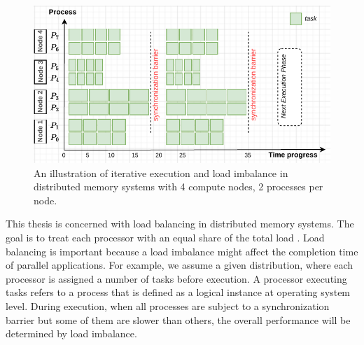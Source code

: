 \begin{figure}[t]
	\centering
	\includegraphics[scale=0.75]{./pictures/introduction/intro_usecase.pdf}
	\caption{An illustration of iterative execution and load imbalance in distributed memory systems with 4 compute nodes, 2 processes per node.}
	\label{fig:intro_usecase}
\end{figure}

This thesis is concerned with load balancing in distributed memory systems. The goal is to treat each processor with an equal share of the total load \cite{cybenko1989dynamic}. Load balancing is important because a load imbalance might affect the completion time of parallel applications. For example, we assume a given distribution, where each processor is assigned a number of tasks before execution. A processor executing tasks refers to a process that is defined as a logical instance at operating system level. During execution, when all processes are subject to a synchronization barrier but some of them are slower than others, the overall performance will be determined by load imbalance.\\

